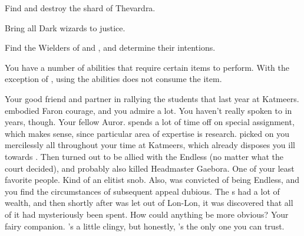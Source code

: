 \documentclass[char]{Katmeers}
\begin{document}
\begin{itemz}[Goals]
	\item Find and destroy the shard of Thevardra.
	\item Bring all Dark wizards to justice.
	\item Find the Wielders of \iPower{} and \iCourage{}, and determine their intentions.
\end{itemz}

\begin{itemz}[Notes]
	\item You have a number of abilities that require certain items to perform. With the exception of \aDekuStun{}, using the abilities does not consume the item.
\end{itemz}

\begin{contacts}
	\contact{\cGinny{}} Your good friend and partner in rallying the students that last year at Katmeers. \cGinny{\they} embodied Faron courage, and you admire \cGinny{\them} a lot. You haven't really spoken to \cGinny{\them} in years, though.
	\contact{\cHermione{}} Your fellow Auror. \cHermione{\They} spends a lot of time off on special assignment, which makes sense, since \cHermione{\their} particular area of expertise is research.
	\contact{\cMalfoy{}} \cMalfoy{\formal} picked on you mercilessly all throughout your time at Katmeers, which already disposes you ill towards \cMalfoy{\them}. Then \cMalfoy{\they} turned out to be allied with the Endless (no matter what the court decided), and probably also killed Headmaster Gaebora. One of your least favorite people.
	\contact{\cLucius{}} Kind of an elitist snob. Also, \cLucius{} was convicted of being Endless, and you find the circumstances of \cLucius{\their} subsequent appeal dubious. The \cLucius{\formal}s had a lot of wealth, and then shortly after \cLucius{} was let out of Lon-Lon, it was discovered that all of it had mysteriously been spent. How could anything be more obvious?
	\contact{\cFairy{}} Your fairy companion. \cFairy{\they}'s a little clingy, but honestly, \cFairy{\they}'s the only one you can trust.
\end{contacts}
\end{document}
